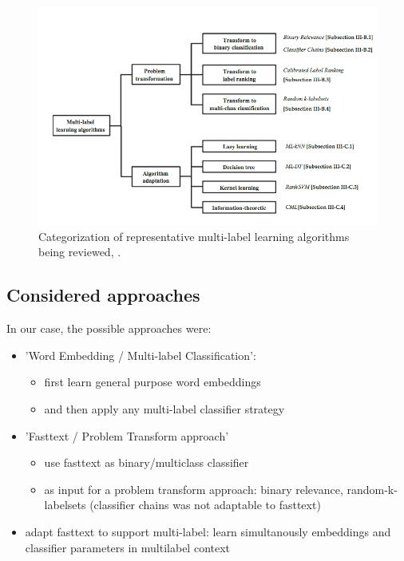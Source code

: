 \begin{figure}[H]
\centering
\includegraphics[scale=0.6]{./images/machine-learning/multi-label-approaches.png}
\caption{Categorization of representative multi-label learning algorithms being reviewed, \cite{MultilabelReview}.}
\label{fig:multilabelOverview}
\end{figure}


\subsection{Considered approaches}

In our case, the possible approaches were:
\begin{itemize}
	\item 'Word Embedding / Multi-label Classification':
	\begin{itemize}
		\item first learn general purpose word embeddings
		\item and then apply any multi-label classifier strategy
	\end{itemize}
	\item 'Fasttext / Problem Transform approach'
	\begin{itemize}
		\item use fasttext as binary/multiclass classifier
		\item as input for a problem transform approach: binary relevance, random-k-labelsets (classifier chains was not adaptable to fasttext)
	\end{itemize}
	\item adapt fasttext to support multi-label: learn simultanously embeddings and classifier parameters in multilabel context
\end{itemize}

